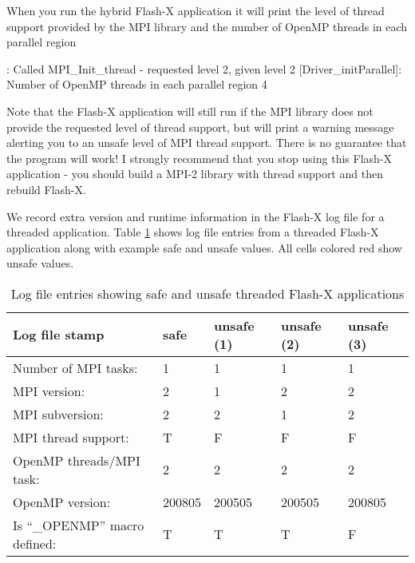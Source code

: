 When you run the hybrid Flash-X application it will print the level of
thread support provided by the MPI library and the number of OpenMP
threads in each parallel region

\begin{codeseg}
: Called MPI_Init_thread - requested level   2, given level   2
[Driver_initParallel]: Number of OpenMP threads in each parallel region  4
\end{codeseg}

Note that the Flash-X application will still run if the MPI library does
not provide the requested level of thread support, but will print a
warning message alerting you to an unsafe level of MPI thread support.
There is no guarantee that the program will work!  I strongly
recommend that you stop using this Flash-X application - you should
build a MPI-2 library with thread support and then rebuild Flash-X.

We record extra version and runtime information in the Flash-X log file
for a threaded application.  Table \ref{tab:flash_openmp_logs} shows
log file entries from a threaded Flash-X application along with example
safe and unsafe values.  All cells colored red show unsafe values.

\begin{table}[!h]
\begin{center}
    \begin{tabular}{ | l | l | l | l | l |}
    \hline

    {\bf Log file stamp} & {\bf safe} & {\bf unsafe (1)} & {\bf unsafe
      (2)} & {\bf unsafe (3)}\\ \hline

    Number of MPI tasks:                  & 1 & 1 & 1 & 1\\ \hline
    MPI version:                          & 2 & \cellcolor{red} 1 & 2 & 2\\ \hline
    MPI subversion:                       & 2 & 2 & 1 & 2\\ \hline
    MPI thread support:                   & T & \cellcolor{red} F & \cellcolor{red} F & \cellcolor{red} F\\ \hline
    OpenMP threads/MPI task:              & 2 & 2 & 2 & 2\\ \hline
    OpenMP version:                       & 200805 & 200505 & 200505 & 200805\\ \hline
    Is ``\_OPENMP'' macro defined:        & T & T & T & \cellcolor{red} F\\ \hline

    \end{tabular}
    \caption{Log file entries showing safe and unsafe threaded Flash-X
      applications}
    \label{tab:flash_openmp_logs}
\end{center}
\end{table}

